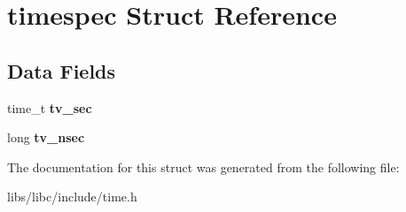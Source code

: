 \hypertarget{structtimespec}{}\section{timespec Struct Reference}
\label{structtimespec}
\subsection*{Data Fields}
\begin{DoxyCompactItemize}
\item 
time\+\_\+t {\bfseries tv\+\_\+sec}\hypertarget{structtimespec_afc3302668d7cb5952f590da69fdd4955}{}\label{structtimespec_afc3302668d7cb5952f590da69fdd4955}

\item 
long {\bfseries tv\+\_\+nsec}\hypertarget{structtimespec_ae3c7510dafa8cbcaede866ed13c99683}{}\label{structtimespec_ae3c7510dafa8cbcaede866ed13c99683}

\end{DoxyCompactItemize}


The documentation for this struct was generated from the following file\+:\begin{DoxyCompactItemize}
\item 
libs/libc/include/time.\+h\end{DoxyCompactItemize}
